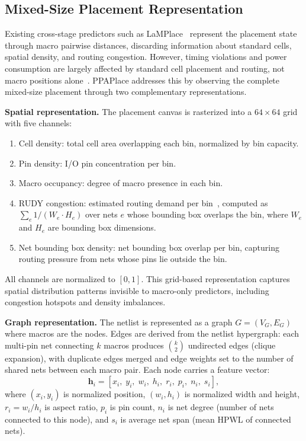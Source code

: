 \documentclass[sigconf,anonymous,review,9pt]{acmart}
\begin{document}
\subsection{Mixed-Size Placement Representation}
\label{subsec:representation}

Existing cross-stage predictors such as LaMPlace~\cite{lamplace2025} represent the
placement state through macro pairwise distances, discarding information
about standard cells, spatial density, and routing congestion. However,
timing violations and power consumption are largely affected by
standard cell placement and routing, not macro positions
alone~\cite{chipbench2025}. PPAPlace addresses this by observing the
complete mixed-size placement through two complementary representations.

\textbf{Spatial representation.} The placement canvas is rasterized into
a $64 \times 64$ grid with five channels:
\begin{enumerate}
    \item Cell density: total cell area overlapping each bin,
    normalized by bin capacity.
    \item Pin density: I/O pin concentration per bin.
    \item Macro occupancy: degree of macro presence in each bin.
    \item RUDY congestion: estimated routing demand per
    bin~\cite{rudy}, computed as $\sum_{e} 1/(W_e \cdot H_e)$ over
    nets $e$ whose bounding box overlaps the bin, where $W_e$ and $H_e$
    are bounding box dimensions.
    \item Net bounding box density: net bounding box overlap
    per bin, capturing routing pressure from nets whose
    pins lie outside the bin.
\end{enumerate}
All channels are normalized to $[0, 1]$. This grid-based representation
captures spatial distribution patterns invisible to macro-only
predictors, including congestion hotspots and density imbalances.

\textbf{Graph representation.} The netlist is represented as a graph
$G = (V_G, E_G)$ where macros are the nodes. Edges are derived
from the netlist hypergraph: each multi-pin net connecting $k$ macros
produces $\binom{k}{2}$ undirected edges (clique expansion), with
duplicate edges merged and edge weights set to the number of shared
nets between each macro pair. Each node carries
a feature vector:
\begin{equation}
\label{eq:node_features}
\mathbf{h}_i = [x_i,\; y_i,\; w_i,\; h_i,\; r_i,\; p_i,\;
n_i,\; s_i],
\end{equation}
where $(x_i, y_i)$ is normalized position, $(w_i, h_i)$ is normalized
width and height, $r_i = w_i / h_i$ is aspect ratio, $p_i$ is pin
count, $n_i$ is net degree (number of nets connected to this node), and
$s_i$ is average net span (mean HPWL of connected nets). 
\end{document}
